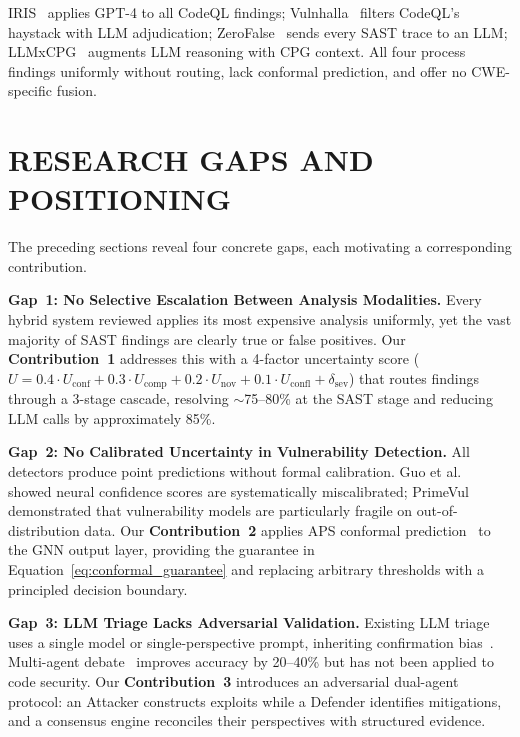 IRIS~\cite{iris2025} applies GPT-4 to all CodeQL findings;
Vulnhalla~\cite{vulnhalla2025} filters CodeQL's haystack with LLM
adjudication; ZeroFalse~\cite{zerofalse2025} sends every SAST trace to
an LLM; LLMxCPG~\cite{llmxcpg2025} augments LLM reasoning with CPG
context. All four process findings uniformly without routing, lack
conformal prediction, and offer no CWE-specific fusion.

\section{\uppercase{Research Gaps and Positioning}}
\label{sec:gaps}

The preceding sections reveal four concrete gaps, each motivating a
corresponding contribution.

\textbf{Gap~1: No Selective Escalation Between Analysis Modalities.}
Every hybrid system reviewed applies its most expensive analysis
uniformly, yet the vast majority of SAST findings are clearly true or
false positives. Our \textbf{Contribution~1} addresses this with a
4-factor uncertainty score ($U = 0.4 \cdot U_{\text{conf}} + 0.3 \cdot
U_{\text{comp}} + 0.2 \cdot U_{\text{nov}} + 0.1 \cdot
U_{\text{confl}} + \delta_{\text{sev}}$) that routes findings through a
3-stage cascade, resolving $\sim$75--80\% at the SAST stage and reducing
LLM calls by approximately 85\%.

\textbf{Gap~2: No Calibrated Uncertainty in Vulnerability Detection.}
All detectors produce point predictions without formal calibration.
Guo et al.~\cite{guocalibration2017} showed neural confidence scores are
systematically miscalibrated; PrimeVul~\cite{primevul2024} demonstrated
that vulnerability models are particularly fragile on out-of-distribution
data. Our \textbf{Contribution~2} applies APS conformal
prediction~\cite{romano2020} to the GNN output layer, providing the
guarantee in Equation~\ref{eq:conformal_guarantee} and replacing
arbitrary thresholds with a principled decision boundary.

\textbf{Gap~3: LLM Triage Lacks Adversarial Validation.}
Existing LLM triage uses a single model or single-perspective prompt,
inheriting confirmation bias~\cite{steenhoek2024}. Multi-agent
debate~\cite{multiagentdebate2023, divergentthinking2023} improves
accuracy by 20--40\% but has not been applied to code security. Our
\textbf{Contribution~3} introduces an adversarial dual-agent protocol:
an Attacker constructs exploits while a Defender identifies mitigations,
and a consensus engine reconciles their perspectives with structured
evidence.

